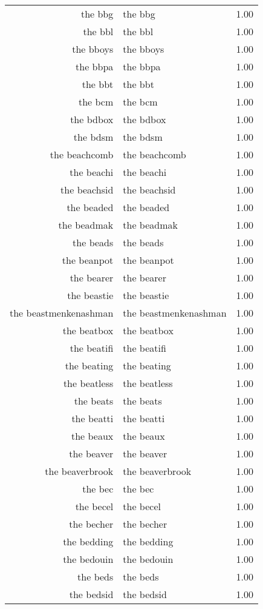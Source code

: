 \begin{table}[ht]
\begin{tabular}{rlr}
  the bbg & the bbg & 1.00 \\ 
  the bbl & the bbl & 1.00 \\ 
  the bboys & the bboys & 1.00 \\ 
  the bbpa & the bbpa & 1.00 \\ 
  the bbt & the bbt & 1.00 \\ 
  the bcm & the bcm & 1.00 \\ 
  the bdbox & the bdbox & 1.00 \\ 
  the bdsm & the bdsm & 1.00 \\ 
  the beachcomb & the beachcomb & 1.00 \\ 
  the beachi & the beachi & 1.00 \\ 
  the beachsid & the beachsid & 1.00 \\ 
  the beaded & the beaded & 1.00 \\ 
  the beadmak & the beadmak & 1.00 \\ 
  the beads & the beads & 1.00 \\ 
  the beanpot & the beanpot & 1.00 \\ 
  the bearer & the bearer & 1.00 \\ 
  the beastie & the beastie & 1.00 \\ 
  the beastmenkenashman & the beastmenkenashman & 1.00 \\ 
  the beatbox & the beatbox & 1.00 \\ 
  the beatifi & the beatifi & 1.00 \\ 
  the beating & the beating & 1.00 \\ 
  the beatless & the beatless & 1.00 \\ 
  the beats & the beats & 1.00 \\ 
  the beatti & the beatti & 1.00 \\ 
  the beaux & the beaux & 1.00 \\ 
  the beaver & the beaver & 1.00 \\ 
  the beaverbrook & the beaverbrook & 1.00 \\ 
  the bec & the bec & 1.00 \\ 
  the becel & the becel & 1.00 \\ 
  the becher & the becher & 1.00 \\ 
  the bedding & the bedding & 1.00 \\ 
  the bedouin & the bedouin & 1.00 \\ 
  the beds & the beds & 1.00 \\ 
  the bedsid & the bedsid & 1.00 \\ 

\end{tabular}
\end{table}
